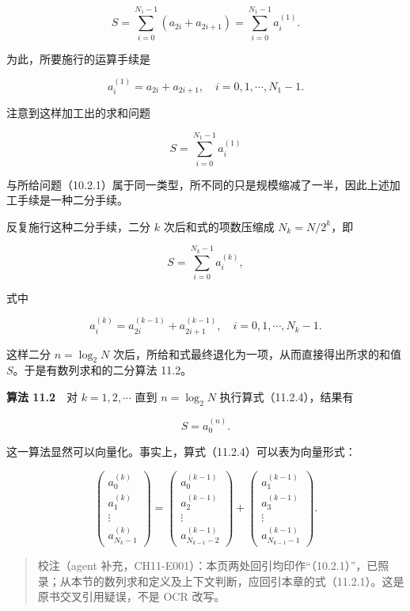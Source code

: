 \[
S=\sum_{i=0}^{N_1-1}(a_{2i}+a_{2i+1})=\sum_{i=0}^{N_1-1}a_i^{(1)}.
\]

为此，所要施行的运算手续是

\[
a_i^{(1)}=a_{2i}+a_{2i+1},\quad i=0,1,\cdots,N_1-1.
\]

注意到这样加工出的求和问题

\[
S=\sum_{i=0}^{N_1-1}a_i^{(1)}
\]

与所给问题（10.2.1）属于同一类型，所不同的只是规模缩减了一半，因此上述加工手续是一种二分手续。

反复施行这种二分手续，二分 \(k\) 次后和式的项数压缩成 \(N_k=N/2^k\)，即

\[
S=\sum_{i=0}^{N_k-1}a_i^{(k)},
\]

式中

\[
a_i^{(k)}=a_{2i}^{(k-1)}+a_{2i+1}^{(k-1)},\quad i=0,1,\cdots,N_k-1.
\tag{11.2.4}
\]

这样二分 \(n=\log_2 N\) 次后，所给和式最终退化为一项，从而直接得出所求的和值 \(S\)。于是有数列求和的二分算法 11.2。

\textbf{算法 11.2}　对 \(k=1,2,\cdots\) 直到 \(n=\log_2 N\) 执行算式（11.2.4），结果有

\[
S=a_0^{(n)}.
\]

这一算法显然可以向量化。事实上，算式（11.2.4）可以表为向量形式：

\[
\begin{pmatrix}
a_0^{(k)}\\
a_1^{(k)}\\
\vdots\\
a_{N_k-1}^{(k)}
\end{pmatrix}
=
\begin{pmatrix}
a_0^{(k-1)}\\
a_2^{(k-1)}\\
\vdots\\
a_{N_{k-1}-2}^{(k-1)}
\end{pmatrix}
+
\begin{pmatrix}
a_1^{(k-1)}\\
a_3^{(k-1)}\\
\vdots\\
a_{N_{k-1}-1}^{(k-1)}
\end{pmatrix}.
\]

\begin{quote}
校注（agent 补充，CH11-E001）：本页两处回引均印作``（10.2.1）''，已照录；从本节的数列求和定义及上下文判断，应回引本章的式（11.2.1）。这是原书交叉引用疑误，不是 OCR 改写。
\end{quote}

